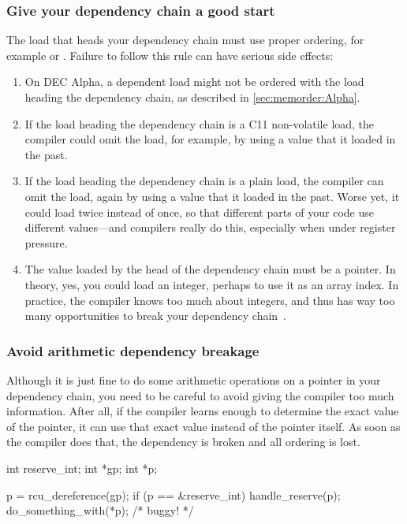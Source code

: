 \subsubsection{Give your dependency chain a good start}
The load that heads your dependency chain must use proper
ordering, for example  or .
Failure to follow this rule can have serious side effects:

\begin{enumerate}
\item	On DEC Alpha, a dependent load might not be ordered with
	the load heading the dependency chain, as described in
	\cref{sec:memorder:Alpha}.
\item	If the load heading the dependency chain is a
	C11 non-volatile  load,
	the compiler could omit the load, for example, by using a value
	that it loaded in the past.
\item	If the load heading the dependency chain is a plain load,
	the compiler can omit the load, again by using a value
	that it loaded in the past.
	Worse yet, it could load twice instead of once, so that
	different parts of your code use different values---and
	compilers really do this, especially when under register
	pressure.
\item	The value loaded by the head of the dependency chain must
	be a pointer.
	In theory, yes, you could load an integer, perhaps to use
	it as an array index.
	In practice, the compiler knows too much about integers,
	and thus has way too many opportunities to break your
	dependency chain~\cite{PaulEMcKennneyConsumeP0190R4}.
\end{enumerate}

\subsubsection{Avoid arithmetic dependency breakage}
Although it is just fine to do some arithmetic operations on a pointer in
your dependency chain, you need to be careful to avoid giving the
compiler too much information.
After all, if the compiler learns enough to determine the exact value
of the pointer, it can use that exact value instead of the pointer itself.
As soon as the compiler does that, the dependency is broken and all
ordering is lost.

\begin{listing}[tbp]
\begin{fcvlabel}
\begin{VerbatimL}[commandchars=\\\[\]]
int reserve_int;
int *gp;
int *p;

p = rcu_dereference(gp);
if (p == &reserve_int)		\lnlbl[cmp]
	handle_reserve(p);	\lnlbl[handle]
do_something_with(*p); /* buggy! */
\end{VerbatimL}
\end{fcvlabel}
\caption{Breakable Dependencies With Comparisons}
\label{lst:memorder:Breakable Dependencies With Comparisons}
\end{listing}

